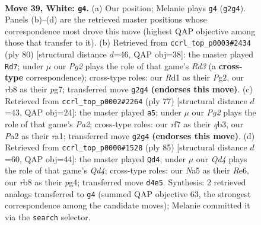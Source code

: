 \documentclass[11pt]{article}
\begin{document}
\clearpage

\begin{figure}[p]\centering
\begin{subfigure}{0.46\textwidth}\centering
\resizebox{\linewidth}{!}{%
\newchessgame
\chessboard[
  setfen={1r4k1/5r1p/8/Np6/3Q3P/8/PP3PP1/3R1K2 w - - 1 39},
  showmover=false,
  pgfstyle=straightmove, color=movearrow, markmove={g2-g4}
]}
\caption{}
\end{subfigure}\hfill
\begin{subfigure}{0.46\textwidth}\centering
\resizebox{\linewidth}{!}{%
\newchessgame
\chessboard[
  setfen={1q3rk1/5pp1/7p/8/4QP2/3R2KP/6P1/8 w - - 11 41},
  showmover=false,
  pgfstyle=straightmove, color=movearrow, markmove={d3-d7}
]}
\caption{}
\end{subfigure}
\\[4pt]
\begin{subfigure}{0.46\textwidth}\centering
\resizebox{\linewidth}{!}{%
\newchessgame
\chessboard[
  setfen={1kr5/pp1q2pp/8/8/2n5/1Q3P2/7P/R3R2K b - - 1 39},
  showmover=false,
  pgfstyle=straightmove, color=movearrow, markmove={a7-a5}
]}
\caption{}
\end{subfigure}\hfill
\begin{subfigure}{0.46\textwidth}\centering
\resizebox{\linewidth}{!}{%
\newchessgame
\chessboard[
  setfen={5k2/5p1p/2p1r3/3q4/2p3P1/P6P/1P3R2/2Q3K1 b - - 6 43},
  showmover=false,
  pgfstyle=straightmove, color=movearrow, markmove={d5-d4}
]}
\caption{}
\end{subfigure}
\caption{\textbf{Move 39, White: \texttt{g4}.} (a) Our position; Melanie plays \texttt{g4} (\texttt{g2g4}). Panels (b)--(d) are the retrieved master positions whose correspondence most drove this move (highest QAP objective among those that transfer to it). (b) Retrieved from \texttt{ccrl\_top\_p0003\#2434} (ply 80) [structural distance $d$=46, QAP obj=38]: the master played \texttt{Rd7}; under $\mu$ our \emph{Pg2} plays the role of that game's \emph{Rd3} (a \textbf{cross-type} correspondence); cross-type roles: our \emph{R}d1 as their \emph{P}g2, our \emph{r}b8 as their \emph{p}g7; transferred move \texttt{g2g4} \textbf{(endorses this move)}. (c) Retrieved from \texttt{ccrl\_top\_p0002\#2264} (ply 77) [structural distance $d$=43, QAP obj=24]: the master played \texttt{a5}; under $\mu$ our \emph{Pg2} plays the role of that game's \emph{Pa2}; cross-type roles: our \emph{r}f7 as their \emph{q}b3, our \emph{P}a2 as their \emph{r}a1; transferred move \texttt{g2g4} \textbf{(endorses this move)}. (d) Retrieved from \texttt{ccrl\_top\_p0000\#1528} (ply 85) [structural distance $d$=60, QAP obj=44]: the master played \texttt{Qd4}; under $\mu$ our \emph{Qd4} plays the role of that game's \emph{Qd4}; cross-type roles: our \emph{N}a5 as their \emph{R}e6, our \emph{r}b8 as their \emph{p}g4; transferred move \texttt{d4e5}. Synthesis: 2 retrieved analogs transferred to \texttt{g4} (summed QAP objective 63, the strongest correspondence among the candidate moves); Melanie committed it via the \texttt{search} selector.}
\label{fig:thought-m76}
\end{figure}
\end{document}
